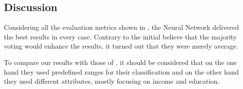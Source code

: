 

\subsection{Discussion}

Considering all the evaluation metrics shown in , the Neural Network delivered the best results in every case. Contrary to the initial believe that the majority voting would enhance the results, it turned out that they were merely average. 
 
To compare our results with those of \cite{indian}, it should be considered that on the one hand they used predefined ranges for their classification and on the other hand they used different attributes, mostly focusing on income and education.



